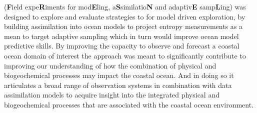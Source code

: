 \proj (\textbf{F}ield expe\textbf{R}iments for mod\textbf{E}ling,
a\textbf{S}similatio\textbf{N} and adaptiv\textbf{E}
samp\textbf{L}ing) was designed to explore and evaluate strategies to
for model driven exploration, by building assimilation into ocean
models to project entropy measurements as a mean to target adaptive
sampling which in turn would improve ocean model predictive skills.
By improving the capacity to observe and forecast a coastal ocean
domain of interest the approach was meant to significantly contribute
to improving our understanding of how the combination of physical and
biogeochemical processes may impact the coastal ocean. And in doing so
it articulates a broad range of observation systems in combination
with data assimilation models to acquire insight into the integrated
physical and biogeochemical processes that are associated with the
coastal ocean environment.


